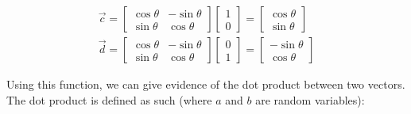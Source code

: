 \documentclass{article}
\begin{document}
\begin{gather} 
\vec{c} = \begin{bmatrix}\cos \theta & -\sin \theta \\ \sin \theta & \cos \theta \end{bmatrix}  \begin{bmatrix}1  \\ 0 \end{bmatrix} =  \begin{bmatrix}\cos \theta  \\ \sin \theta \end{bmatrix} \\
\vec{d} = \begin{bmatrix}\cos \theta & -\sin \theta \\ \sin \theta & \cos \theta \end{bmatrix}  \begin{bmatrix}0 \\ 1 \end{bmatrix} =  \begin{bmatrix}-\sin \theta  \\ \cos \theta \end{bmatrix}
\end{gather} 

Using this function, we can give evidence of the dot product between two vectors. 
\\The dot product is defined as such (where $a$ and $b$ are random variables):
\end{document}
